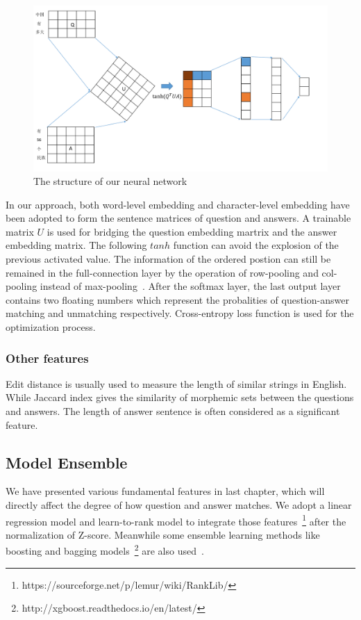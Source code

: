 \documentclass{llncs}
\begin{document}
\begin{figure}[htb]
\centering
\includegraphics[width=12cm]{figures/nn.pdf}
\caption{ The structure of our neural network}
\label{fig:model}
\end{figure}
In our approach, both word-level embedding and character-level embedding have been adopted to form the sentence matrices of question and answers. A trainable matrix $U$ is used for bridging the question embedding martrix and the answer embedding matrix. The following $tanh$ function can avoid the explosion of the previous activated value. The information of the ordered postion can still be remained in the full-connection layer by the operation of row-pooling and col-pooling instead of max-pooling~\cite{Santos2016Attentive}. After the softmax layer, the last output layer contains two floating numbers which represent the probalities of question-answer matching and unmatching respectively. Cross-entropy loss function is used for the optimization process.

\subsubsection{Other features}
Edit distance is usually used to measure the length of similar strings in English. While Jaccard index gives the similarity of morphemic sets between the questions and answers. The length of answer sentence is often considered as a significant feature.




\subsection{Model Ensemble}
\label{sec:model}
We have presented various fundamental features in last chapter, which will directly affect the degree of how question and answer matches. We adopt a linear regression model and learn-to-rank model \cite{Liu2009Learning} to integrate those features~\footnote{https://sourceforge.net/p/lemur/wiki/RankLib/} after the normalization of Z-score. Meanwhile some ensemble learning methods like boosting and bagging models~\footnote{http://xgboost.readthedocs.io/en/latest/} are also used~\cite{Chen2016XGBoost}. 
\end{document}
